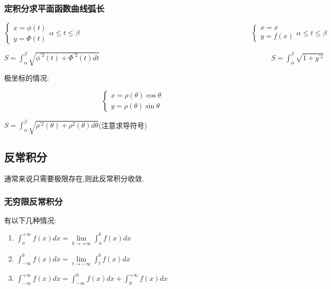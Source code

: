 \documentclass[UTF8,12pt]{ctexbook}
\newcommand{\limNormal}[1]{\lim\limits_{#1}}
\newcommand{\defFunction}[1]{f(#1)}
\newcommand{\definiteIntegral}[2]{\int^{#1}_{#2}}
\begin{document}
{{{{}%

\subsubsection{定积分求平面函数曲线弧长}{

  $$
    \begin{cases}
      x = \phi(t) \\
      y = \Phi(t)
    \end{cases}
    \alpha \leq t \leq \beta
    \qquad\qquad\qquad\qquad\qquad\qquad\qquad\qquad\qquad\qquad\qquad\qquad
    \begin{cases}
      x = x \\
      y = \defFunction{x}
    \end{cases}
    \alpha \leq t \leq \beta
  $$

  $S = \definiteIntegral{\beta}{\alpha}\sqrt{\phi^{\prime 2}(t) + \Phi^{\prime 2}(t) dt}\qquad\qquad\qquad\qquad\qquad\qquad\qquad\qquad\qquad\qquad\qquad\qquad S = \definiteIntegral{\beta}{\alpha}\sqrt{1 + y^{\prime 2}}$

  极坐标的情况:

  $$
    \begin{cases}
      x = \rho(\theta)\cos\theta \\
      y = \rho(\theta)\sin\theta
    \end{cases}
  $$

  $S = \definiteIntegral{\beta}{\alpha}\sqrt{\rho^{\prime 2}(\theta) + \rho^2(\theta)d\theta}$\qquad(注意求导符号)
}%

}%

\subsection{反常积分}{
通常来说只需要极限存在,则此反常积分收敛.

\subsubsection{无穷限反常积分}{

  有以下几种情况:

  \begin{enumerate}
    \item $\definiteIntegral{+\infty}{a}\defFunction{x}dx = \limNormal{b \to +\infty}\definiteIntegral{b}{a}\defFunction{x}dx$
    \item $\definiteIntegral{b}{-\infty}\defFunction{x}dx = \limNormal{t \to -\infty}\definiteIntegral{b}{t}\defFunction{x}dx$
    \item $\definiteIntegral{+\infty}{-\infty}\defFunction{x}dx = \definiteIntegral{0}{-\infty}\defFunction{x}dx + \definiteIntegral{+\infty}{0}\defFunction{x}dx$
  \end{enumerate}
}%


}}}
\end{document}
